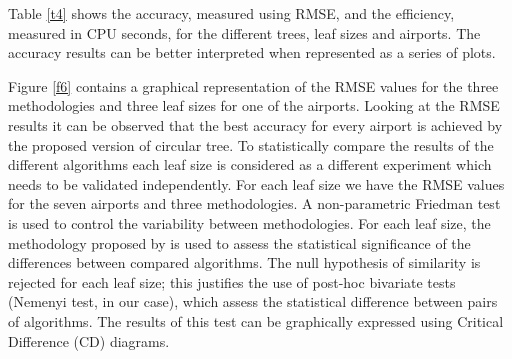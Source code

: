 \documentclass[times,twocolumn,final,authoryear]{elsarticle}
\begin{document}
Table \ref{t4} shows the accuracy, measured using RMSE, and the efficiency, measured in CPU seconds, for the different trees, leaf sizes and airports. The accuracy results can be better interpreted when represented as a series of plots.

Figure \ref{f6} contains a graphical representation of the RMSE values for the three methodologies and three leaf sizes for one of the airports. Looking at the RMSE results it can be observed that the best accuracy for every airport is achieved by the proposed version of circular tree. To statistically compare the results of the different algorithms each leaf size is considered as a different experiment which needs to be validated independently. For each leaf size we have the RMSE values for the seven airports and three methodologies. A non-parametric Friedman test is used to control the variability between methodologies. For each leaf size, the methodology proposed by \citep{Demsar2006} is used to assess the statistical significance of the differences between compared algorithms. The null hypothesis of similarity is rejected for each leaf size; this justifies the use of post-hoc bivariate tests (Nemenyi test, in our case), which assess the statistical difference between pairs of algorithms. The results of this test can be graphically expressed using Critical Difference (CD) diagrams.
\end{document}
